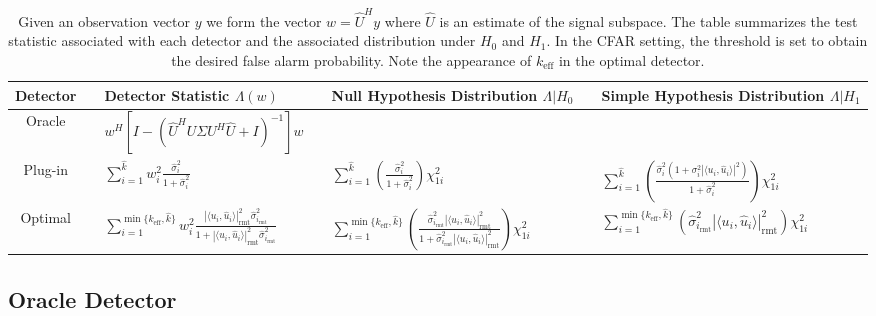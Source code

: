 \begin{table}[!ht]
\centering
\begin{tabular}{cclclcl}\toprule
 Detector & \phantom{a} & Detector Statistic $\Lambda(w)$ & \phantom{a} & Null Hypothesis Distribution $\Lambda|H_0$& \phantom{a} & Simple Hypothesis Distribution $\Lambda|H_1$\\
\midrule
Oracle && $ w^H\left[I-\left(\widehat{U}^HU\Sigma U^H\widehat{U}+I\right)^{-1}\right]w$ &&  && \\
Plug-in && $\sum_{i=1}^{\widehat{k}}w_i^2\frac{\widehat{\sigma}_i^2}{1+\widehat{\sigma}_i^2}$ && $\sum_{i=1}^{\widehat{k}}\left(\frac{\widehat{\sigma}_i^2}{1+\widehat{\sigma}_i^2}\right)\chi^2_{1i}$ && $\sum_{i=1}^{\widehat{k}}\left(\frac{\widehat{\sigma}_i^2\left(1+\sigma^2_i|\langle u_i,\widehat{u}_i\rangle|^2\right)}{1+\widehat{\sigma}_i^2}\right)\chi^2_{1i}$\\
 Optimal&& $\sum_{i=1}^{\min\{k_\text{eff},\widehat{k}\}}w_i^2\frac{|\langle u_i,\widehat{u}_i\rangle|^2_{\text{rmt}}\widehat{\sigma}_{i_\text{rmt}}^2}{1+|\langle u_i,\widehat{u}_i\rangle|^2_{\text{rmt}}\widehat{\sigma}_{i_\text{rmt}}^2 }$ && $\sum_{i=1}^{\min\{k_\text{eff},\widehat{k}\}}\left(\frac{\widehat{\sigma}_{i_\text{rmt}}^2|\langle u_i,\widehat{u}_i\rangle|^2_{\text{rmt}}}{1+\widehat{\sigma}_{i_\text{rmt}}^2|\langle u_i,\widehat{u}_i\rangle|^2_{\text{rmt}}}\right)\chi^2_{1i}$ && $\sum_{i=1}^{\min\{k_\text{eff},\widehat{k}\}}\left(\widehat{\sigma}^2_{i_\text{rmt}}|\langle u_i,\widehat{u}_i\rangle|^2_{\text{rmt}}\right)\chi^2_{1i}$\\
\bottomrule
\end{tabular}
\caption{Given an observation vector $y$ we form the vector $w=\widehat{U}^Hy$ where $\widehat{U}$ is an estimate of the signal subspace. The table summarizes the test statistic associated with each detector and the associated distribution under $H_0$ and $H_1$. In the CFAR setting, the threshold is  set to obtain the desired false alarm probability. Note the appearance of $k_\text{eff}$ in the optimal detector.}\vskip-0.2cm
\label{table: main results}
\end{table}

\subsection{Oracle Detector}\label{sec:oracle}

